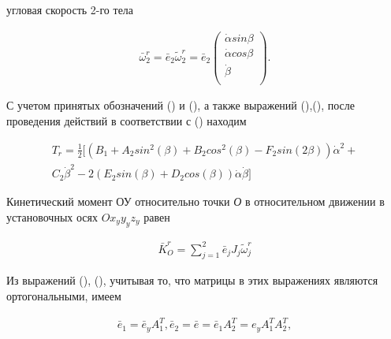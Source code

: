 угловая скорость 2-го тела\par

\begin{equation}
\label{eq:p3:10}
\begin{alignedat}{2}
 \bar{\omega}_{2}^{r}=\bar{e}_{2} \tilde{\omega}_{2}^{r}=\bar{e}_{2} \left( \begin{matrix}
\dot{\alpha} sin \beta \\
\dot{\alpha} cos \beta \\
\dot{\beta} \\
\end{matrix}
\right) .
\end{alignedat}
\end{equation}

С учетом принятых обозначений () и (), а также выражений (),(), после проведения действий в соответствии с () находим\par

\begin{equation}
\label{eq:p3:11}
\begin{alignedat}{2}
T_{r}=
\frac{1}{2} 
[  
	( 
		B_{1}+
		A_{2}sin^{2} (  \beta  ) +
		B_{2}cos^{2} (  \beta  ) -
		F_{2}sin ( 2 \beta  )  
	)  \dot{\alpha}^{2} + \\
	C_{2} \dot{\beta}^{2} -  
	2 ( 
		E_{2}sin (  \beta  ) +
		D_{2}cos (  \beta  )  
	)  
	\dot{\alpha}  \dot{\beta}  
] 
\end{alignedat}
\end{equation}

Кинетический момент ОУ относительно точки \textit{О} в относительном движении в установочных осях  \( Ox_{y}y_{y}z_{y} \)  равен\par

\begin{equation}
\label{eq:p3:12}
\begin{alignedat}{2}
\bar{K}_{O}^{r}= \sum_{j=1}^{2}\bar{e}_{j}J_{j} \tilde{\omega}_{j}^{r}
\end{alignedat}
\end{equation}

Из выражений (), (), учитывая то, что матрицы в этих выражениях являются ортогональными, имеем\par

\begin{equation}
\label{eq:p3:13}
\begin{alignedat}{2}
\bar{e}_{1} = \bar{e}_{y} A_{1}^{T} ,
\bar{e}_{2} = 
\bar{e} = 
\bar{e}_{1}A_{2}^{T} = 
e_{y}A_{1}^{T}A_{2}^{T} ,
\end{alignedat}
\end{equation}

